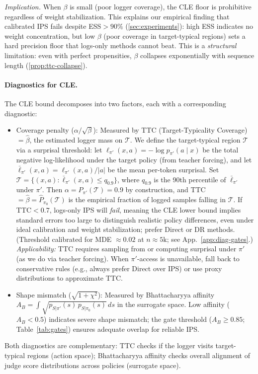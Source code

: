 \emph{Implication.} When $\beta$ is small (poor logger coverage), the CLE floor is prohibitive regardless of weight stabilization. This explains our empirical finding that calibrated IPS fails despite ESS${}>90\%$ (\cref{sec:experiments}): high ESS indicates no weight concentration, but low $\beta$ (poor coverage in target-typical regions) sets a hard precision floor that logs-only methods cannot beat. This is a \emph{structural} limitation: even with perfect propensities, $\beta$ collapses exponentially with sequence length (\cref{prop:ttc-collapse}).

\paragraph{Diagnostics for CLE.}
The CLE bound decomposes into two factors, each with a corresponding diagnostic:
\begin{itemize}[nosep,leftmargin=*]
\item Coverage penalty ($\alpha/\sqrt{\beta}$): Measured by TTC (Target-Typicality Coverage) $= \hat\beta$, the estimated logger mass on $\mathcal{T}$.
We define the target-typical region $\mathcal{T}$ via a surprisal threshold: let $\ell_{\pi'}(x,a) = -\log p_{\pi'}(a \mid x)$ be the total negative log-likelihood under the target policy (from teacher forcing), and let $\bar\ell_{\pi'}(x,a) = \ell_{\pi'}(x,a)/|a|$ be the mean per-token surprisal. Set $\mathcal{T} = \{(x,a) : \bar\ell_{\pi'}(x,a) \le q_{0.9}\}$, where $q_{0.9}$ is the 90th percentile of $\bar\ell_{\pi'}$ under $\pi'$.
Then $\alpha = P_{\pi'}(\mathcal{T}) = 0.9$ by construction, and TTC $= \hat\beta = \hat P_{\pi_0}(\mathcal{T})$ is the empirical fraction of logged samples falling in $\mathcal{T}$.
If TTC${}<0.7$, logs-only IPS will \emph{fail}, meaning the CLE lower bound implies standard errors too large to distinguish realistic policy differences, even under ideal calibration and weight stabilization; prefer Direct or DR methods. (Threshold calibrated for MDE ${\approx}0.02$ at $n{\approx}5\text{k}$; see App.~\ref{app:diag-gates}.)
\emph{Applicability:} TTC requires sampling from or computing surprisal under $\pi'$ (as we do via teacher forcing). When $\pi'$-access is unavailable, fall back to conservative rules (e.g., always prefer Direct over IPS) or use proxy distributions to approximate TTC.
\item Shape mismatch ($\sqrt{1+\chi^2}$): Measured by Bhattacharyya affinity $A_B = \int \sqrt{p_{S|\pi'}(s)\,p_{S|\pi_0}(s)}\,ds$ in the surrogate space. Low affinity ($A_B < 0.5$) indicates severe shape mismatch; the gate threshold ($A_B \geq 0.85$; Table~\ref{tab:gates}) ensures adequate overlap for reliable IPS.
\end{itemize}
Both diagnostics are complementary: TTC checks if the logger visits target-typical regions (action space); Bhattacharyya affinity checks overall alignment of judge score distributions across policies (surrogate space).

